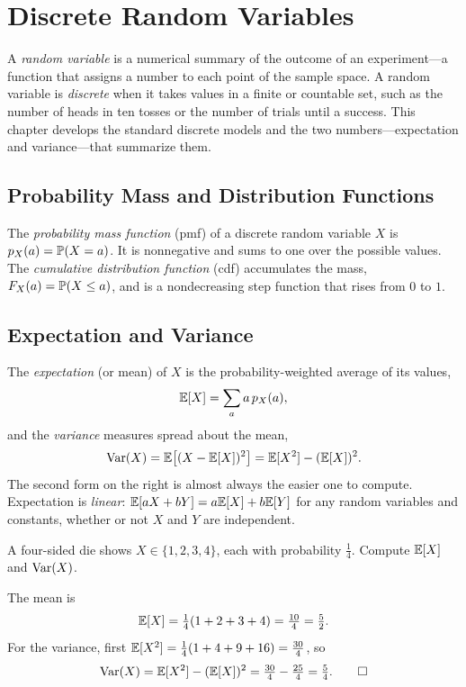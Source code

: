 \chapter{Discrete Random Variables}
\label{ch:discrete}

A \emph{random variable} is a numerical summary of the outcome of an
experiment—a function that assigns a number to each point of the sample space.
A random variable is \emph{discrete} when it takes values in a finite or
countable set, such as the number of heads in ten tosses or the number of
trials until a success. This chapter develops the standard discrete models and
the two numbers—expectation and variance—that summarize them.

\section{Probability Mass and Distribution Functions}

The \emph{probability mass function} (pmf) of a discrete random variable $X$ is
$p_X(a)=\mathbb{P}(X=a)$. It is nonnegative and sums to one over the possible values.
The \emph{cumulative distribution function} (cdf) accumulates the mass,
$F_X(a)=\mathbb{P}(X\le a)$, and is a nondecreasing step function that rises from $0$
to $1$.

\section{Expectation and Variance}

The \emph{expectation} (or mean) of $X$ is the probability-weighted average of
its values,
\[
  \mathbb{E}[X]=\sum_a a\,p_X(a),
\]
and the \emph{variance} measures spread about the mean,
\[
  \mathrm{Var}(X)=\mathbb{E}\bigl[(X-\mathbb{E}[X])^2\bigr]=\mathbb{E}[X^2]-(\mathbb{E}[X])^2.
\]
The second form on the right is almost always the easier one to compute.
Expectation is \emph{linear}: $\mathbb{E}[aX+bY]=a\mathbb{E}[X]+b\mathbb{E}[Y]$ for any random variables
and constants, whether or not $X$ and $Y$ are independent.

\begin{example}
A four-sided die shows $X\in\{1,2,3,4\}$, each with probability $\tfrac14$.
Compute $\mathbb{E}[X]$ and $\mathrm{Var}(X)$.

\solution The mean is
\[
  \mathbb{E}[X]=\tfrac14(1+2+3+4)=\tfrac{10}{4}=\tfrac52.
\]
For the variance, first $\mathbb{E}[X^2]=\tfrac14(1+4+9+16)=\tfrac{30}{4}$, so
\[
  \mathrm{Var}(X)=\mathbb{E}[X^2]-(\mathbb{E}[X])^2=\tfrac{30}{4}-\tfrac{25}{4}=\tfrac54. \qedhere
\]
\end{example}

